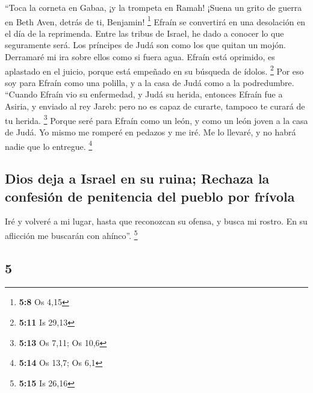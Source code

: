 \begin{paracol}{2}
 ``Toca la corneta en Gabaa, ¡y la trompeta en Ramah!
¡Suena un grito de guerra en Beth Aven, detrás de ti, Benjamin!
\footnote{\textbf{5:8} Os 4,15}  Efraín se convertirá en
una desolación en el día de la reprimenda. Entre las tribus de Israel,
he dado a conocer lo que seguramente será.  Los príncipes
de Judá son como los que quitan un mojón. Derramaré mi ira sobre ellos
como si fuera agua.  Efraín está oprimido, es aplastado
en el juicio, porque está empeñado en su búsqueda de ídolos. \footnote{\textbf{5:11}
  Is 29,13}  Por eso soy para Efraín como una polilla, y
a la casa de Judá como a la podredumbre.  ``Cuando Efraín
vio su enfermedad, y Judá su herida, entonces Efraín fue a Asiria, y
enviado al rey Jareb: pero no es capaz de curarte, tampoco te curará de
tu herida. \footnote{\textbf{5:13} Os 7,11; Os 10,6} 
Porque seré para Efraín como un león, y como un león joven a la casa de
Judá. Yo mismo me romperé en pedazos y me iré. Me lo llevaré, y no habrá
nadie que lo entregue. \footnote{\textbf{5:14} Os 13,7; Os 6,1}

\hypertarget{dios-deja-a-israel-en-su-ruina-rechaza-la-confesiuxf3n-de-penitencia-del-pueblo-por-fruxedvola}{%
\subsection{Dios deja a Israel en su ruina; Rechaza la confesión de
penitencia del pueblo por
frívola}\label{dios-deja-a-israel-en-su-ruina-rechaza-la-confesiuxf3n-de-penitencia-del-pueblo-por-fruxedvola}}

 Iré y volveré a mi lugar, hasta que reconozcan su
ofensa, y busca mi rostro. En su aflicción me buscarán con ahínco''.
\footnote{\textbf{5:15} Is 26,16}

\switchcolumn
\begin{otherlanguage}{english}

\hypertarget{section-9}{%
\section{5}\label{section-9}}


\end{otherlanguage}
\end{paracol}

